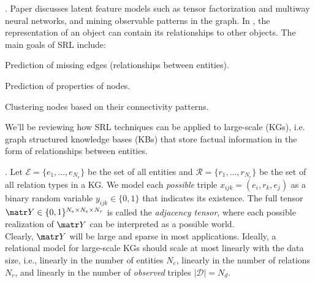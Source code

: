 \documentclass[11pt]{article}
\newcommand\myspace[1][]{\vspace{#1\bigskipamount}}
\newcommand\p{\Needspace{10\baselineskip} \noindent}
\begin{document}
\p {}. Paper discusses latent feature models such as tensor factorization and multiway neural networks, and mining observable patterns in the graph. In , the representation of an object can contain its relationships to other objects. The main goals of SRL include:
\begin{compactitem}
	\item Prediction of missing edges (relationships between entities).
	\item Prediction of properties of nodes.
	\item Clustering nodes based on their connectivity patterns.
\end{compactitem}
We'll be reviewing how SRL techniques can be applied to large-scale  (KGs), i.e. graph structured knowledge bases (KBs) that store factual information in the form of relationships between entities.

\myspace
\p {}. Let $\mathcal{E} = \{e_1, \ldots, e_{N_e} \}$ be the set of all entities and $\mathcal R = \{r_1, \ldots, r_{N_r}\}$ be the set of all relation types in a KG. We model each \textit{possible} triple $x_{ijk} = (e_i, r_k, e_j)$ as a binary random variable $y_{ijk} \in \{0, 1\}$ that indicates its existence. The full tensor $\matr Y \in \{0, 1\}^{N_e \times N_e \times N_r}$ is called the \textit{adjacency tensor}, where each possible realization of $\matr Y$ can be interpreted as a possible world.\\

\p Clearly, $\matr Y$ will be large and sparse in most applications. Ideally, a relational model for large-scale KGs should scale at most linearly with the data size, i.e., linearly in the number of entities $N_e$, linearly in the number of relations $N_r$, and linearly in the number of \textit{observed} triples $|\mathcal D| = N_d$.
\end{document}
